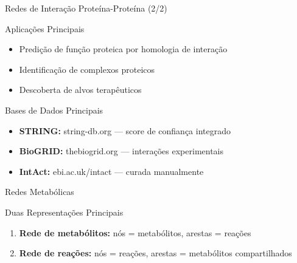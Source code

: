 \begin{frame}[shrink=5]{Redes de Interação Proteína-Proteína (2/2)}
\begin{block}{Aplicações Principais}
\begin{itemize}
    \item Predição de função proteica por homologia de interação
    \item Identificação de complexos proteicos
    \item Descoberta de alvos terapêuticos
\end{itemize}
\end{block}

\vspace{0.3cm}

\begin{exampleblock}{Bases de Dados Principais}
\begin{itemize}
    \item \textbf{STRING:} string-db.org — score de confiança integrado
    \item \textbf{BioGRID:} thebiogrid.org — interações experimentais
    \item \textbf{IntAct:} ebi.ac.uk/intact — curada manualmente
\end{itemize}
\end{exampleblock}
\end{frame}

\begin{frame}[shrink=10]{Redes Metabólicas}
\begin{block}{Duas Representações Principais}
\begin{enumerate}
    \item \textbf{Rede de metabólitos:} nós = metabólitos, arestas = reações
    \item \textbf{Rede de reações:} nós = reações, arestas = metabólitos compartilhados
\end{enumerate}
\end{block}

\begin{center}
\end{center}
\end{frame}

